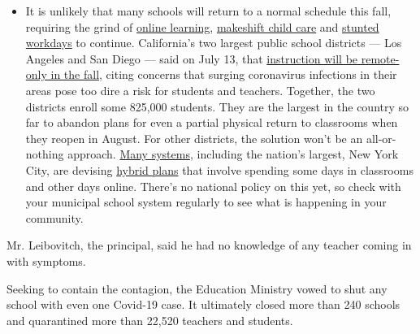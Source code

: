 \begin{itemize}
  \begin{itemize}
  \tightlist
  \item
    It is unlikely that many schools will return to a normal schedule
    this fall, requiring the grind of
    \href{https://www.nytimes.com/2020/06/05/us/coronavirus-education-lost-learning.html?action=click\&pgtype=Article\&state=default\&region=MAIN_CONTENT_3\&context=storylines_faq}{online
    learning},
    \href{https://www.nytimes.com/2020/05/29/us/coronavirus-child-care-centers.html?action=click\&pgtype=Article\&state=default\&region=MAIN_CONTENT_3\&context=storylines_faq}{makeshift
    child care} and
    \href{https://www.nytimes.com/2020/06/03/business/economy/coronavirus-working-women.html?action=click\&pgtype=Article\&state=default\&region=MAIN_CONTENT_3\&context=storylines_faq}{stunted
    workdays} to continue. California's two largest public school
    districts --- Los Angeles and San Diego --- said on July 13, that
    \href{https://www.nytimes.com/2020/07/13/us/lausd-san-diego-school-reopening.html?action=click\&pgtype=Article\&state=default\&region=MAIN_CONTENT_3\&context=storylines_faq}{instruction
    will be remote-only in the fall}, citing concerns that surging
    coronavirus infections in their areas pose too dire a risk for
    students and teachers. Together, the two districts enroll some
    825,000 students. They are the largest in the country so far to
    abandon plans for even a partial physical return to classrooms when
    they reopen in August. For other districts, the solution won't be an
    all-or-nothing approach.
    \href{https://bioethics.jhu.edu/research-and-outreach/projects/eschool-initiative/school-policy-tracker/}{Many
    systems}, including the nation's largest, New York City, are
    devising
    \href{https://www.nytimes.com/2020/06/26/us/coronavirus-schools-reopen-fall.html?action=click\&pgtype=Article\&state=default\&region=MAIN_CONTENT_3\&context=storylines_faq}{hybrid
    plans} that involve spending some days in classrooms and other days
    online. There's no national policy on this yet, so check with your
    municipal school system regularly to see what is happening in your
    community.
  \end{itemize}
\end{itemize}

Mr. Leibovitch, the principal, said he had no knowledge of any teacher
coming in with symptoms.

Seeking to contain the contagion, the Education Ministry vowed to shut
any school with even one Covid-19 case. It ultimately closed more than
240 schools and quarantined more than 22,520 teachers and students.

